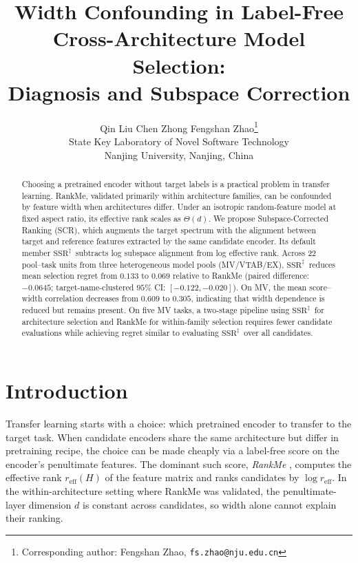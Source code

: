 \documentclass{article}
\title{Width Confounding in Label-Free Cross-Architecture Model Selection:\\
       Diagnosis and Subspace Correction}
\author{%
  Qin Liu \quad Chen Zhong \quad Fengshan Zhao\thanks{Corresponding author: Fengshan Zhao, \texttt{fs.zhao@nju.edu.cn}}\\
  State Key Laboratory of Novel Software Technology\\
  Nanjing University, Nanjing, China
}
\date{}
\newcommand{\reff}{\ensuremath{r_{\mathrm{eff}}}\xspace}
\newcommand{\SSRdag}{\ensuremath{\mathrm{SSR}^{\ddagger}}\xspace}
\begin{document}
\maketitle

\begin{abstract}
Choosing a pretrained encoder without target labels is a practical problem in transfer learning. RankMe, validated primarily within architecture families, can be confounded by feature width when architectures differ. Under an isotropic random-feature model at fixed aspect ratio, its effective rank scales as $\Theta(d)$. We propose Subspace-Corrected Ranking (SCR), which augments the target spectrum with the alignment between target and reference features extracted by the same candidate encoder. Its default member \SSRdag\ subtracts log subspace alignment from log effective rank. Across $22$ pool--task units from three heterogeneous model pools (MV/VTAB/EX), \SSRdag\ reduces mean selection regret from $0.133$ to $0.069$ relative to RankMe (paired difference: $-0.0645$; target-name-clustered $95\%$ CI: $[-0.122,-0.020]$). On MV, the mean score--width correlation decreases from $0.609$ to $0.305$, indicating that width dependence is reduced but remains present. On five MV tasks, a two-stage pipeline using \SSRdag\ for architecture selection and RankMe for within-family selection requires fewer candidate evaluations while achieving regret similar to evaluating \SSRdag\ over all candidates.
\end{abstract}

\section{Introduction}
\label{sec:intro}

Transfer learning starts with a choice: which pretrained encoder to transfer to the target task. When candidate encoders share the same architecture but differ in pretraining recipe, the choice can be made cheaply via a label-free score on the encoder's penultimate features. The dominant such score, \emph{RankMe} \citep{garrido2023rankme}, computes the effective rank $\reff(H)$ of the feature matrix and ranks candidates by $\log\reff$. In the within-architecture setting where RankMe was validated, the penultimate-layer dimension $d$ is constant across candidates, so width alone cannot explain their ranking.
\end{document}
